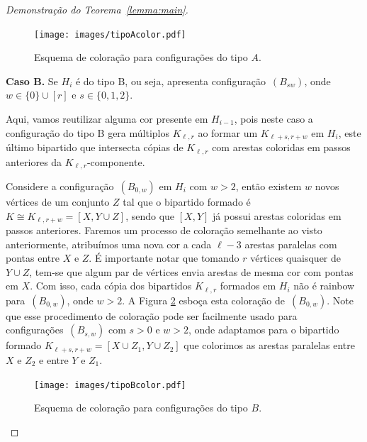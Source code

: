 \documentclass[12pt,a4paper]{book}
\newcommand{\K}{K_{\ell,r}} %
\begin{document}
\begin{proof}[Demonstração do Teorema~\ref{lemma:main}]
 \begin{figure}[htb] \centering \texttt{[image: images/tipoAcolor.pdf]}
   \caption{Esquema de coloração para configurações do tipo $A$.}
   \label{fig:configAcor}
 \end{figure}

        \medskip \textbf{Caso B.} Se $H_i$ é do tipo B, ou seja, apresenta configuração~\hyperlink{HconfigB}{$(B_{sw})$}, onde $w \in \{0\}\cup [r]$ e $s \in\{0,1,2\}$.
        
        Aqui, vamos reutilizar alguma cor presente em $H_{i-1}$, pois neste caso a configuração do tipo B gera múltiplos $\K$ ao formar um $K_{\ell+s,r+w}$ em $H_i$, este último bipartido que intersecta cópias de $\K$ com arestas coloridas em passos anteriores da $\K$-componente.
        
      Considere a configuração~\hyperlink{HconfigB}{$(B_{0,w})$} em
      $H_i$ com $w > 2$, então existem $w$ novos vértices de um conjunto $Z$ tal que o bipartido formado é $K \cong K_{\ell,r+w} =[X, Y \cup Z]$, sendo que $[X,Y]$ já possui arestas coloridas em passos anteriores. %
       Faremos um processo de coloração semelhante ao visto anteriormente, atribuímos uma nova cor a cada $\ell-3$ arestas paralelas com pontas entre $X$ e $Z$. 
      É importante notar que tomando $r$ vértices quaisquer de $Y \cup Z$, tem-se que algum par de vértices envia arestas de mesma cor com pontas em $X$.
      Com isso, cada cópia dos bipartidos $\K$ formados em $H_i$ não é rainbow para~\hyperlink{HconfigB}{$(B_{0,w})$}, onde $w >2$. 
      A Figura \ref{fig:configBcor} esboça esta coloração de~\hyperlink{HconfigB}{$(B_{0,w})$}.
      Note que esse procedimento de coloração pode ser facilmente usado para configurações~\hyperlink{HconfigB}{$(B_{s,w})$} com $s>0$ e $w>2$, onde adaptamos para o bipartido formado $K_{\ell+s,r+w} =[X\cup Z_1, Y \cup Z_2]$ que colorimos as arestas paralelas entre $X$ e $Z_2$ e entre $Y$ e $Z_1$.


 \begin{figure}[htb] \centering \texttt{[image: images/tipoBcolor.pdf]}
   \caption{Esquema de coloração para configurações do tipo $B$.}
   \label{fig:configBcor}
 \end{figure}
      

\end{proof}
\end{document}
